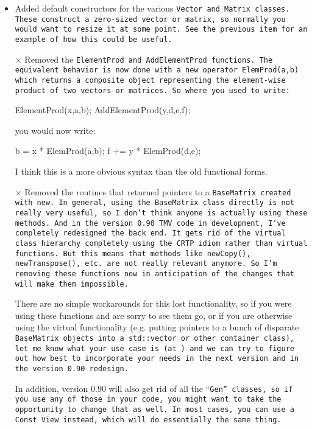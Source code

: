 \begin{itemize}
\item
Added default constructors for the various \tt{Vector} and \tt{Matrix} classes.  These construct a zero-sized vector or matrix, so normally you would want to resize it at some point.  See the previous item for an example of how this could be useful.

\item[$\times$] Removed the \tt{ElementProd} and \tt{AddElementProd} functions.  The equivalent behavior is now done with a new operator \tt{ElemProd(a,b)} which returns a composite object representing the element-wise product of two vectors or matrices.  So where you used to write:
\begin{tmvcode}
ElementProd(x,a,b);
AddElementProd(y,d,e,f);
\end{tmvcode}
you would now write:
\begin{tmvcode}
b = x * ElemProd(a,b);
f += y * ElemProd(d,e);
\end{tmvcode}
I think this is a more obvious syntax than the old functional forms.

\item[$\times$] 
Removed the routines that returned pointers to a \tt{BaseMatrix} created with \tt{new}.  In general, using the \tt{BaseMatrix} class directly is not really very useful, so I don't think anyone is actually using these methods.  And in the version 0.90 TMV code in development, I've completely redesigned the back end.  It gets rid of the virtual class hierarchy completely using the CRTP idiom rather than virtual functions.  But this means that methods like \tt{newCopy()}, \tt{newTranspose()}, etc. are not really relevant anymore.  So I'm removing these functions now in anticipation of the changes that will make them impossible.

There are no simple workarounds for this lost functionality, so if you were using these functions and are sorry to see them go, or if you are otherwise using the virtual functionality (e.g. putting pointers to a bunch of disparate \tt{BaseMatrix} objects into a \tt{std::vector} or other container class), let me know what your use case is (at \mygroup) and we can try to figure out how best to incorporate your needs in the next version and in the version 0.90 redesign.

In addition, version 0.90 will also get rid of all the ``\tt{Gen}'' classes,
so if you use any of those in your code, you might want to take the opportunity to change that as well.  In most cases, you can use a \tt{Const} \tt{View} instead, which will do essentially the same thing.


\end{itemize}

